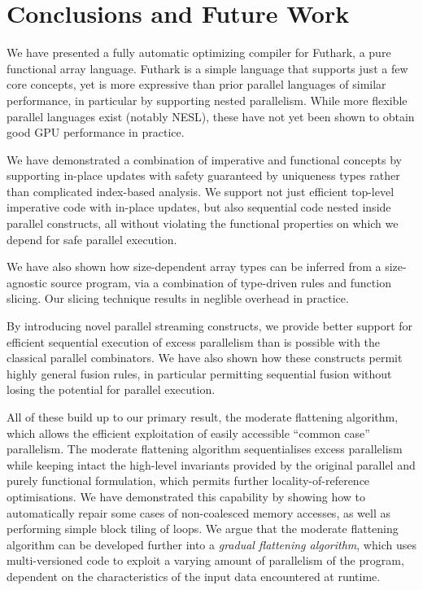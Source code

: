 \chapter{Conclusions and Future Work}
\label{chap:conclusions}

We have presented a fully automatic optimizing compiler for Futhark, a
pure functional array language.  Futhark is a simple language that
supports just a few core concepts, yet is more expressive than prior
parallel languages of similar performance, in particular by supporting
nested parallelism.  While more flexible parallel languages exist
(notably NESL), these have not yet been shown to obtain good GPU
performance in practice.

We have demonstrated a combination of imperative and functional
concepts by supporting in-place updates with safety guaranteed by
uniqueness types rather than complicated index-based analysis.  We
support not just efficient top-level imperative code with in-place
updates, but also sequential code nested inside parallel constructs,
all without violating the functional properties on which we depend for
safe parallel execution.

We have also shown how size-dependent array types can be inferred from
a size-agnostic source program, via a combination of type-driven rules
and function slicing.  Our slicing technique results in neglible
overhead in practice.

By introducing novel parallel streaming constructs, we provide better
support for efficient sequential execution of excess parallelism than
is possible with the classical parallel combinators.  We have also
shown how these constructs permit highly general fusion rules, in
particular permitting sequential fusion without losing the potential
for parallel execution.

All of these build up to our primary result, the moderate flattening
algorithm, which allows the efficient exploitation of easily
accessible ``common case'' parallelism.  The moderate flattening
algorithm sequentialises excess parallelism while keeping intact the
high-level invariants provided by the original parallel and purely
functional formulation, which permits further locality-of-reference
optimisations.  We have demonstrated this capability by showing how to
automatically repair some cases of non-coalesced memory accesses, as
well as performing simple block tiling of loops.  We argue that the
moderate flattening algorithm can be developed further into a
\textit{gradual flattening algorithm}, which uses multi-versioned code
to exploit a varying amount of parallelism of the program, dependent
on the characteristics of the input data encountered at runtime.


